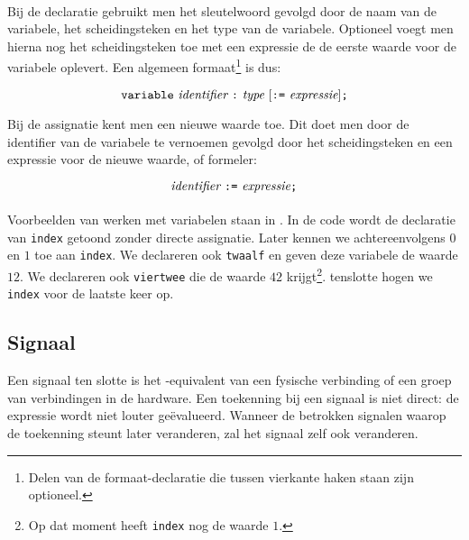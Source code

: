 \paragraph{}
Bij de declaratie gebruikt men het sleutelwoord  gevolgd door de naam van de variabele, het \vhdltermen{:} scheidingsteken en het type van de variabele. Optioneel voegt men hierna nog het \vhdltermen{:=} scheidingsteken toe met een expressie de de eerste waarde voor de variabele oplevert. Een algemeen formaat\footnote{Delen van de formaat-declaratie die tussen vierkante haken staan zijn optioneel.} is dus:

\begin{equation}%
\vhdltermen{variable}\ \textit{identifier}\ \vhdltermen{:}\ \textit{type}\ [\vhdltermen{:=}\ \textit{expressie}]\vhdltermen{;}
\end{equation}

Bij de assignatie kent men een nieuwe waarde toe. Dit doet men door de identifier van de variabele te vernoemen gevolgd door het \vhdltermen{:=} scheidingsteken en een expressie voor de nieuwe waarde, of formeler:

\begin{equation}%
\textit{identifier}\ \vhdltermen{:=}\ \textit{expressie}\vhdltermen{;}
\end{equation}

\paragraph{}
Voorbeelden van werken met variabelen staan in . In de code wordt de declaratie van \texttt{index} getoond zonder directe assignatie. Later kennen we achtereenvolgens $0$ en $1$ toe aan \texttt{index}. We declareren ook \texttt{twaalf} en geven deze variabele de waarde $12$. We declareren ook \texttt{viertwee} die de waarde $42$ krijgt\footnote{Op dat moment heeft \texttt{index} nog de waarde $1$.}. tenslotte hogen we \texttt{index} voor de laatste keer op.


\subsection{Signaal}
Een signaal ten slotte is het \tvhdl{}-equivalent van een fysische verbinding of een groep van verbindingen in de hardware. Een toekenning bij een signaal is niet direct: de expressie wordt niet louter ge\"evalueerd. Wanneer de betrokken signalen waarop de toekenning steunt later veranderen, zal het signaal zelf ook veranderen.

